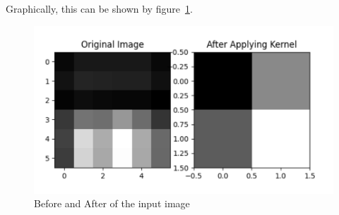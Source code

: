 \begin{itemize}
	Graphically, this can be shown by figure~\ref{fig:kernel3}.
		\begin{figure}[htpb]
		\centering
		\includegraphics[width=.7\textwidth]{../Problem 11/kernel_F3.pdf}
		\caption{Before and After of the input image}
		\label{fig:kernel3}
	\end{figure}
	\vspace{3mm}
		
\end{itemize}
\vspace{3mm}






